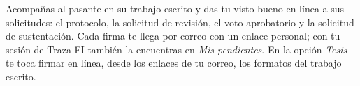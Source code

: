 \documentclass[11pt,a4paper]{article}
\begin{document}
{\small\tableofcontents}
\newpage
\begin{quevasahacer}
Acompañas al pasante en su trabajo escrito y das tu visto bueno en línea a sus solicitudes: el protocolo, la solicitud de revisión, el voto aprobatorio y la solicitud de sustentación. Cada firma te llega por correo con un enlace personal; con tu sesión de Traza FI también la encuentras en \emph{Mis pendientes}. En la opción \emph{Tesis} te toca firmar en línea, desde los enlaces de tu correo, los formatos del trabajo escrito.
\end{quevasahacer}



\end{document}
